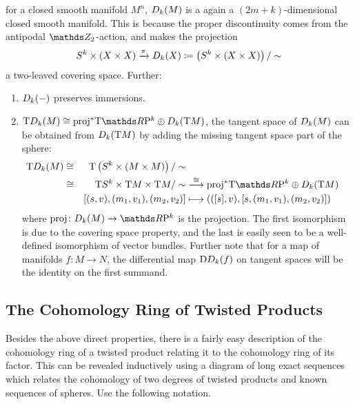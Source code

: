 \begin{Rem}
\begin{enumerate}
    for a closed smooth manifold $M^n$, $D_{k}({M})$ is a
    again a $(2m+k)$-dimensional closed smooth manifold.
    This is because the proper discontinuity comes from the antipodal
    $\Zmod2$-action, and makes the projection
    \begin{gather*}
      S^{k}\times(X\times X)
      \xrightarrow{\pi}
      D_{k}({X})
      \coloneqq
      \left( S^{k}\times(X\times X) \right)/\sim
    \end{gather*}
    a two-leaved covering space.
    Further:
    \begin{enumerate}
    \item\label{item:twistedprodpreservesimmersions}
      $D_{k}({-})$ preserves immersions.
    \item\label{item:twistedprod:tangentspace}
      $\T\Twistedprod{k}{M}
      \cong \pb\proj\T{\RP k} \oplus \Twistedprod{k}{\T M}$,
      \idest the tangent space of $D_{k}({M})$ can be obtained
      from $D_{k}({\mathrm{T}M})$ by adding the missing tangent space
      part of the sphere:
      \begin{alignat*}{4}
        \T{\Twistedprod{k}{M}}
        &\cong& \T{\left(\Twistedprodcovspace{k}{M}\right)}/\sim \\
        &\cong& \T \Sphere k\times \T M\times\T M/\sim
        &\overset{\cong}{\longto}
        \pb\proj \T{\RP k} \oplus \Twistedprod{k}{\T M}
        \\
        &&[(s,v), (m_1,v_1), (m_2,v_2)]
        &\longmapsto
        \left( ([s], v), [s, (m_1,v_1), (m_2, v_2)] \right)
      \end{alignat*}
      where $\proj\colon\Twistedprod{k}{M}\to\RP k$ is the projection.
      The first isomorphism is due to the covering space property, and
      the last is easily seen to be a well-defined isomorphism of
      vector bundles.
      Further note that for a map of manifolds $f\colon M\to N$,
      the differential map $\mathrm{D}D_{k}({f})$ on tangent spaces
      will be the identity on the first summand.
    \end{enumerate}
  \end{enumerate}
\end{Rem}

\subsection{The Cohomology Ring of Twisted Products}
Besides the above direct properties, there is a fairly easy
description of the cohomology ring of a twisted product relating it to
the cohomology ring of its factor.
This can be revealed inductively using a diagram of long exact
sequences which relates the cohomology of two degrees of twisted
products and known sequences of spheres.
Use the following notation.

